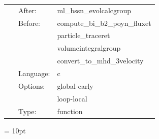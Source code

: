 \documentclass{article}
\begin{document}
\hspace{5mm}{\it convert illinoisgrmhd-native variables to hydrobase } 


\hspace{5mm}

 \begin{tabular*}{160mm}{cll} 
~ & After:  & ml\_bssn\_evolcalcgroup \\ 
~ & Before:  & compute\_bi\_b2\_poyn\_fluxet \\ 
~& ~ &particle\_traceret\\ 
~& ~ &volumeintegralgroup\\ 
~& ~ &convert\_to\_mhd\_3velocity\\ 
~ & Language:  & c \\ 
~ & Options:  & global-early \\ 
~& ~ &loop-local\\ 
~ & Type:  & function \\ 
\end{tabular*} 



\vspace{5mm}\parskip = 10pt 
\end{document}
